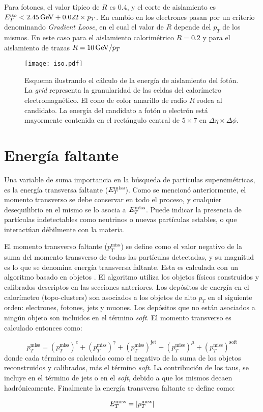 Para fotones, el valor típico de $R$ es $0.4$, y el corte de aislamiento es $E_{T}^{\text{iso}}<2.45 \, \mathrm{GeV} + 0.022 \times p_{T}$. En cambio en los electrones pasan por un criterio denominando \textit{Gradient Loose}, en el cual el valor de $R$ depende del $p_{T}$ de los mismos. En este caso para el aislamiento calorimétrico $R=0.2$ y para el aislamiento de trazas $R=10\, \mathrm{GeV}/p_{T}$

\begin{figure}
\centering
\texttt{[image: iso.pdf]}
\caption{Esquema ilustrando el cálculo de la energía de aislamiento del fotón. La \textit{grid} representa la granularidad de las celdas del calorímetro electromagnético. El cono de color amarillo de radio $R$ rodea al candidato. La energía del candidato a fotón o electrón está mayormente contenida en el rectángulo central de $5 \times 7$ en $\Delta\eta \times \Delta\phi$.}
\label{isolation}
\end{figure}

\section{Energía faltante}

Una variable de suma importancia en la búsqueda de partículas supersimétricas, es la energía transversa faltante ($E_{T}^{\text{miss}}$). Como se mencionó anteriormente, el momento transverso se debe conservar en todo el proceso, y cualquier desequilibrio en el mismo se lo asocia a $E_{T}^{\text{miss}}$. Puede indicar la presencia de partículas indetectables como neutrinos o nuevas partículas estables, o que interactúan débilmente con la materia.

El momento transverso faltante ($p_{T}^{\text{miss}}$) se define como el valor negativo de la suma del momento transverso de todas las partículas detectadas, y su magnitud es lo que se denomina energía transversa faltante. Esta es calculada con un algoritmo basado en objetos \cite{Khoo:2012749}. El algoritmo utiliza los objetos físicos construidos y calibrados descriptos en las secciones anteriores. Los depósitos de energía en el calorímetro (topo-clusters) son asociados a los objetos de alto $p_{T}$ en el siguiente orden: electrones, fotones, jets y muones. Los depósitos que no están asociados a ningún objeto son incluidos en el término \textit{soft}. El momento transverso es calculado entonces como:

\begin{equation}
p_{T}^{\text{miss}}=\left(p_{T}^{\text{miss}}\right)^{e} + \left(p_{T}^{\text{miss}}\right)^{\gamma} + \left(p_{T}^{\text{miss}}\right)^{\text{jet}} +\left(p_{T}^{\text{miss}}\right)^{\mu} + \left(p_{T}^{\text{miss}}\right)^{\text{soft}}
\end{equation}
%
donde cada término es calculado como el negativo de la suma de los objetos reconstruidos y calibrados, más el término \textit{soft}. La contribución de los taus, se incluye en el término de jets o en el \textit{soft}, debido a que los mismos decaen hadrónicamente. Finalmente la energía transversa faltante se define como:

\begin{equation}
E_{T}^{\text{miss}}=|p_{T}^{\text{miss}}|
\end{equation}

